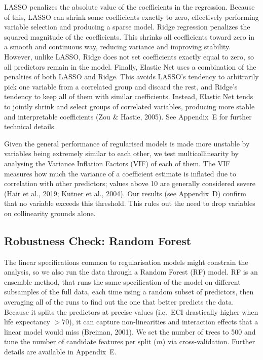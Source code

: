 \documentclass[12pt,a4paper]{report}
\begin{document}
LASSO penalizes the absolute value of the coefficients in the regression. Because of this, LASSO can shrink some coefficients exactly to zero, effectively performing variable selection and producing a sparse model. Ridge regression penalizes the squared magnitude of the coefficients. This shrinks all coefficients toward zero in a smooth and continuous way, reducing variance and improving stability. However, unlike LASSO, Ridge does not set coefficients exactly equal to zero, so all predictors remain in the model. Finally, Elastic Net uses a combination of the penalties of both LASSO and Ridge. This avoids LASSO's tendency to arbitrarily pick one variable from a correlated group and discard the rest, and Ridge's tendency to keep all of them with similar coefficients. Instead, Elastic Net tends to jointly shrink and select groups of correlated variables, producing more stable and interpretable coefficients (Zou \& Hastie, 2005). See Appendix~E for further technical details.

Given the general performance of regularised models is made more unstable by variables being extremely similar to each other, we test multicollinearity by analysing the Variance Inflation Factors (VIF) of each of them. The VIF measures how much the variance of a coefficient estimate is inflated due to correlation with other predictors; values above 10 are generally considered severe (Hair et al., 2019; Kutner et al., 2004). Our results (see Appendix~D) confirm that no variable exceeds this threshold. This rules out the need to drop variables on collinearity grounds alone.

\subsection{Robustness Check: Random Forest}

The linear specifications common to regularisation models might constrain the analysis, so we also run the data through a Random Forest (RF) model. RF is an ensemble method, that runs the same specification of the model on different subsamples of the full data, each time using a random subset of predictors, then averaging all of the runs to find out the one that better predicts the data. Because it splits the predictors at precise values (i.e.\ ECI drastically higher when life expectancy $> 70$), it can capture non-linearities and interaction effects that a linear model would miss (Breiman, 2001). We set the number of trees to 500 and tune the number of candidate features per split ($m$) via cross-validation. Further details are available in Appendix~E.
\end{document}
